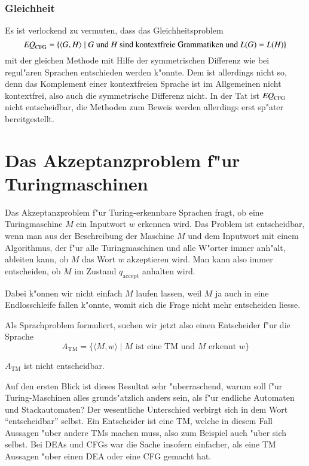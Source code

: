 \subsubsection{Gleichheit}
%
Es ist verlockend zu vermuten, dass das Gleichheitsproblem
\[
\text{\it EQ}_{\text{CFG}}=\{
\langle G,H\rangle\;|\; \text{$G$  und $H$ sind kontextfreie Grammatiken und $L(G)=L(H)$}
\}
\]
%
mit der gleichen Methode mit Hilfe der symmetrischen Differenz
wie bei regul"aren Sprachen entschieden werden k"onnte.
Dem ist
allerdings nicht so, denn das Komplement einer kontextfreien Sprache
ist im Allgemeinen nicht kontextfrei, also auch die symmetrische
Differenz nicht.
In der Tat ist 
$\text{\it EQ}_{\text{CFG}}$ nicht entscheidbar, die Methoden zum Beweis
werden allerdings erst sp"ater bereitgestellt.

\section{Das Akzeptanzproblem f"ur Turingmaschinen}
%
Das Akzeptanzproblem f"ur Turing-erkennbare Sprachen fragt, ob 
eine Turingmaschine $M$ ein Inputwort $w$ erkennen wird.
Das Problem ist entscheidbar, wenn man aus der Beschreibung
der Maschine $M$ und dem Inputwort mit einem Algorithmus, der
f"ur alle Turingmaschinen und alle W"orter immer anh"alt, ableiten
kann, ob $M$ das Wort $w$ akzeptieren wird.
Man kann also immer
entscheiden, ob $M$ im Zustand $q_{\text{accept}}$ anhalten wird.

Dabei k"onnen wir nicht einfach $M$ laufen lassen, weil $M$
ja auch in eine Endlosschleife fallen k"onnte, womit sich die
Frage nicht mehr entscheiden liesse.

Als Sprachproblem formuliert, suchen wir jetzt also einen
Entscheider f"ur die Sprache
\[
A_{\text{TM}}=\{
\langle M,w\rangle\;|\; \text{$M$ ist eine TM und $M$ erkennt $w$}
\}
\]
%

\begin{satz}
\label{ATM}
$A_{\text{TM}}$ ist nicht entscheidbar.
\end{satz}

Auf den ersten Blick ist dieses Resultat sehr "uberraschend, warum
soll f"ur Turing-Maschinen alles grunds"atzlich anders sein, als
f"ur endliche Automaten und Stackautomaten? Der wesentliche Unterschied
verbirgt sich in dem Wort ``entscheidbar'' selbst.
Ein Entscheider ist eine
TM, welche in diesem Fall Aussagen "uber andere TMs machen muss, also
zum Beispiel auch "uber sich selbst.
Bei DEAs und CFGs war die Sache
insofern einfacher, als eine TM Aussagen "uber einen DEA oder eine
CFG gemacht hat.

